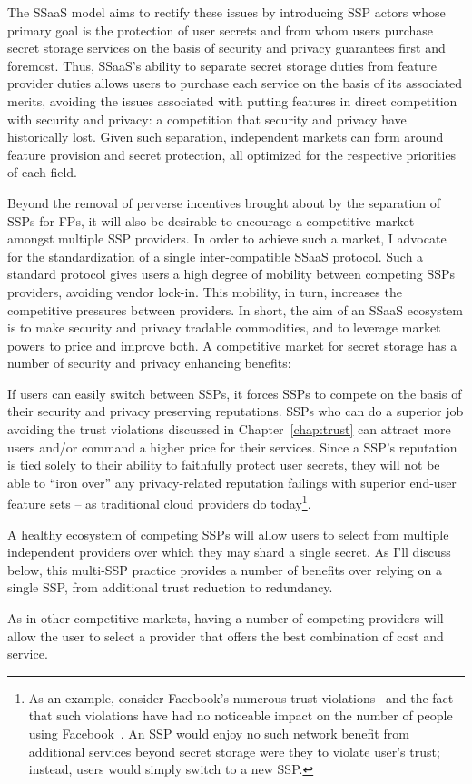 The SSaaS model aims to rectify these issues by introducing SSP actors
whose primary goal is the protection of user secrets and from whom
users purchase secret storage services on the basis of security and
privacy guarantees first and foremost. Thus, SSaaS's ability to
separate secret storage duties from feature provider duties allows
users to purchase each service on the basis of its associated merits,
avoiding the issues associated with putting features in direct
competition with security and privacy: a competition that security and
privacy have historically lost. Given such separation, independent
markets can form around feature provision and secret protection, all
optimized for the respective priorities of each field.

Beyond the removal of perverse incentives brought about by the
separation of SSPs for FPs, it will also be desirable to encourage a
competitive market amongst multiple SSP providers. In order to achieve
such a market, I advocate for the standardization of a single
inter-compatible SSaaS protocol. Such a standard protocol gives users
a high degree of mobility between competing SSPs providers, avoiding
vendor lock-in. This mobility, in turn, increases the competitive
pressures between providers. In short, the aim of an SSaaS ecosystem
is to make security and privacy tradable commodities, and to leverage
market powers to price and improve both. A competitive market for
secret storage has a number of security and privacy enhancing
benefits:

\begin{packed_desc}
\item[Reputation:] If users can easily switch between SSPs, it forces
  SSPs to compete on the basis of their security and privacy
  preserving reputations. SSPs who can do a superior job avoiding the
  trust violations discussed in Chapter~\ref{chap:trust} can attract
  more users and/or command a higher price for their services. Since a
  SSP's reputation is tied solely to their ability to faithfully
  protect user secrets, they will not be able to ``iron over'' any
  privacy-related reputation failings with superior end-user feature
  sets -- as traditional cloud providers do today\footnote{As an
    example, consider Facebook's numerous trust
    violations~\cite{goel2014, lomas2014, tsukayama2014} and the fact
    that such violations have had no noticeable impact on the number
    of people using Facebook~\cite{foster2014}. An SSP would enjoy no
    such network benefit from additional services beyond secret
    storage were they to violate user's trust; instead, users would
    simply switch to a new SSP.}.
\item[Multiple Providers:] A healthy ecosystem of competing SSPs will
  allow users to select from multiple independent providers over which
  they may shard a single secret. As I'll discuss below, this
  multi-SSP practice provides a number of benefits over relying on a
  single SSP, from additional trust reduction to redundancy.
\item[Cost:] As in other competitive markets, having a number of
  competing providers will allow the user to select a provider that
  offers the best combination of cost and service.
\end{packed_desc}

